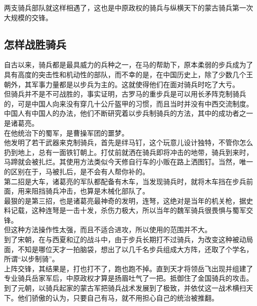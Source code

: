 \begin{multicols}{\theparacolNo}
两支骑兵部队就这样相遇了，这也是中原政权的骑兵与纵横天下的蒙古骑兵第一次大规模的交锋。\\

\subsection{怎样战胜骑兵}
自古以来，骑兵都是最具威力的兵种之一，在马的帮助下，原本柔弱的步兵成为了具有高度的突击性和机动性的部队，而不幸的是，在中国历史上，除了少数几个王朝外，其军事力量都是以步兵为主的。这就使得他们在面对骑兵时吃了大亏。\\

但骑兵并不是不可战胜的，事实证明，古罗马的重步兵是可以用长矛阵克制骑兵的，可是中国人向来没有穿几十公斤盔甲的习惯，而且当时并没有中西交流制度。中国人有中国人的办法，他们不断研究着以步兵制骑兵的方法，其中的成功者之一是诸葛亮。\\

在他统治下的蜀军，是曹操军团的噩梦。\\

他发明了若干武器来克制骑兵，首先是绊马钉，这个玩意儿设计独特，不管你怎么扔到地上，总有一面铁钉朝上。打仗前就洒在骑兵即将冲击的地带，骑兵到来时，马蹄就会被扎烂。其使用方法类似今天修自行车的小贩在路上洒图钉。当然，唯一的区别在于，马被扎后，是不会有人帮你补的。\\

第二招是大车，诸葛亮的军队都配备有木车，当发现骑兵时，就将木车挡在步兵前面，用来阻挡骑兵冲击，也算是木械化部队了。\\

最狠的是第三招，也是诸葛亮最神奇的发明，连弩，这绝对是当年的机关枪，据史料记载，这种连弩是一击十发，杀伤力极大，所以当年的魏军骑兵很畏惧与蜀军交锋。\\

但这种方法操作性太强，而且不适合进攻，所以使用的范围并不大。\\

到了宋朝，在与西夏和辽的战斗中，由于步兵长期打不过骑兵，为改变这种被动局面，不知是哪位天才一拍脑袋，想出了以几千名步兵组成大方阵，还取了个学名，所谓“以步制骑”。\\

上阵交锋，其结果是，打也打不了，跑也跑不掉。直到天才将领岳飞出现并组建了专业骑兵岳家军后，中原政权才算是扬眉吐气了一把。抵御住了金国骑兵的攻击。\\

到了元朝，以骑兵起家的蒙古军把骑兵战术发展到了极致，并依仗这一战术横扫天下。他们骄傲的认为，只要自己有马，就不用担心自己的统治被推翻。\\


\end{multicols}
